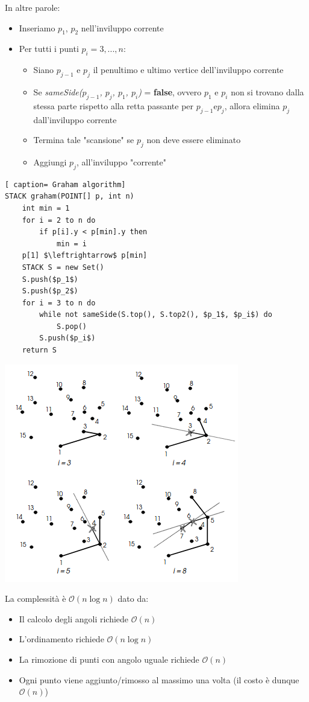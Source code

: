 \documentclass[../cheatSheetAlgoritmi.tex]{subfiles}
\begin{document}
In altre parole:
\begin{itemize}
	\item Inseriamo $p_1$, $p_2$ nell'inviluppo corrente
	\item Per tutti i punti $p_i = 3, . . . , n$:
	\begin{itemize}
		\item Siano $p_{j - 1}$ e $p_j$ il penultimo e ultimo vertice dell'inviluppo corrente
		\item Se \emph{sameSide($p_{j - 1}$, $p_j$, $p_1$, $p_i$)} = \textbf{false}, ovvero $p_1$ e $p_i$ non si trovano dalla stessa parte rispetto alla retta passante per $p_{j - 1}$e$p_j$, allora elimina $p_j$ dall'inviluppo corrente
		\item Termina tale "scansione" se $p_j$ non deve essere eliminato
		\item Aggiungi $p_j$, all'inviluppo "corrente"
	\end{itemize}
\end{itemize}
 \begin{lstlisting}[ caption= Graham algorithm]
STACK graham(POINT[] p, int n)
	int min = 1
	for i = 2 to n do
		if p[i].y < p[min].y then 
			min = i
	p[1] $\leftrightarrow$ p[min]
	STACK S = new Set()
	S.push($p_1$)
	S.push($p_2$)
	for i = 3 to n do
		while not sameSide(S.top(), S.top2(), $p_1$, $p_i$) do
			S.pop()
		S.push($p_i$)
	return S
\end{lstlisting}
\begin{center}
	\includegraphics{ ../img/backtracking_inviluppo_convesso_graham_2}
\end{center}
La complessità è $\mathcal{O}(n \log n)$ dato da:
\begin{itemize}
	\item Il calcolo degli angoli richiede $\mathcal{O}(n)$
	\item L'ordinamento richiede $\mathcal{O}(n \log n)$
	\item La rimozione di punti con angolo uguale richiede $\mathcal{O}(n)$
	\item Ogni punto viene aggiunto/rimosso al massimo una volta (il costo è dunque $\mathcal{O}(n)$)
\end{itemize}
\newpage
\end{document}
